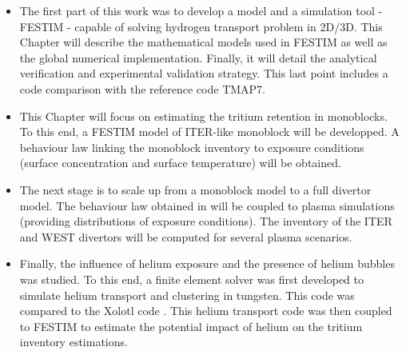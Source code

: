 \begin{itemize}
    \item \textbf{} \newline
The first part of this work was to develop a model and a simulation tool - FESTIM - capable of solving hydrogen transport problem in 2D/3D.
This Chapter will describe the mathematical models used in FESTIM as well as the global numerical implementation.
Finally, it will detail the analytical verification and experimental validation strategy.
This last point includes a code comparison with the reference code TMAP7.
    \item \textbf{} \newline
This Chapter will focus on estimating the tritium retention in monoblocks.
To this end, a FESTIM model of ITER-like monoblock will be developped.
A behaviour law linking the monoblock inventory to exposure conditions (surface concentration and surface temperature) will be obtained.
    \item \textbf{} \newline
The next stage is to scale up from a monoblock model to a full divertor model.
The behaviour law obtained in  will be coupled to plasma simulations (providing distributions of exposure conditions).
The inventory of the ITER and WEST divertors will be computed for several plasma scenarios.
    \item \textbf{} \newline
Finally, the influence of helium exposure and the presence of helium bubbles was studied.
To this end, a finite element solver was first developed to simulate helium transport and clustering in tungsten.
This code was compared to the Xolotl code .
This helium transport code was then coupled to FESTIM to estimate the potential impact of helium on the tritium inventory estimations.
\end{itemize}
